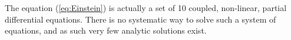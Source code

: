
The equation (\ref{eq:Einstein}) is actually a set of 10 coupled, non-linear, partial differential equations. There is no systematic way to solve such a system of equations, and as such very few analytic solutions exist. 
 


 

